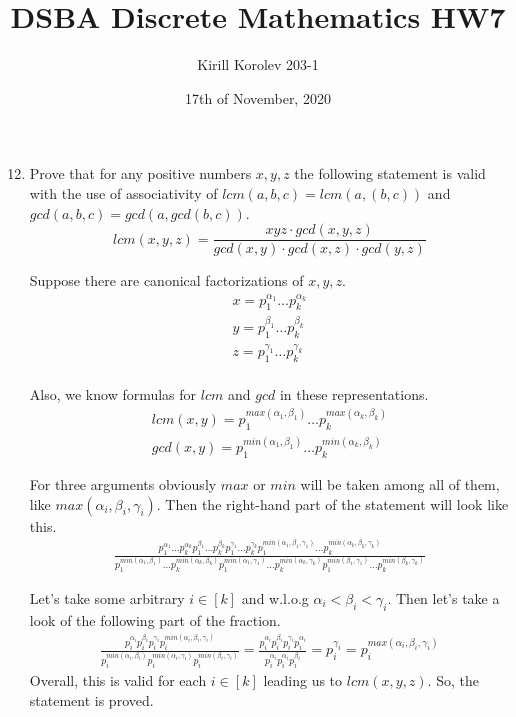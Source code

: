\documentclass{article}
\title{DSBA Discrete Mathematics HW7}
\author{Kirill Korolev 203-1}
\date{17th of November, 2020}
\begin{document}
\maketitle

\begin{enumerate}
\setcounter{enumi}{11}

\item Prove that for any positive numbers $x, y, z$ the following statement is valid with the use of associativity of $lcm(a,b,c)=lcm(a,(b,c))$ and $gcd(a,b,c)=gcd(a,gcd(b,c))$.
\[lcm(x,y,z)=\frac{xyz \cdot gcd(x,y,z)}{gcd(x,y) \cdot gcd(x,z) \cdot gcd(y,z)}\]
\newline

Suppose there are canonical factorizations of $x, y, z$.
\begin{align*}
x=p_1^{\alpha_1}\ldots{}p_k^{\alpha_k}\\
y=p_1^{\beta_1}\ldots{}p_k^{\beta_k}\\
z=p_1^{\gamma_1}\ldots{}p_k^{\gamma_k}\\
\end{align*}

Also, we know formulas for $lcm$ and $gcd$ in these representations.
\begin{align*}
lcm(x,y)=p_1^{max(\alpha_1,\beta_1)}\ldots{}p_k^{max(\alpha_k,\beta_k)}\\
gcd(x,y)=p_1^{min(\alpha_1,\beta_1)}\ldots{}p_k^{min(\alpha_k,\beta_k)}
\end{align*}

For three arguments obviously $max$ or $min$ will be taken among all of them, like $max(\alpha_i,\beta_i,\gamma_i)$. Then the right-hand part of the statement will look like this.
\begin{align*}
\frac{p_1^{\alpha_1}\ldots{}p_k^{\alpha_k}p_1^{\beta_1}\ldots{}p_k^{\beta_k}p_1^{\gamma_1}\ldots{}p_k^{\gamma_k}p_1^{min(\alpha_1,\beta_1,\gamma_1)}\ldots{}p_k^{min(\alpha_k,\beta_k,\gamma_k)}}{p_1^{min(\alpha_1,\beta_1)}\ldots{}p_k^{min(\alpha_k,\beta_k)}p_1^{min(\alpha_1,\gamma_1)}\ldots{}p_k^{min(\alpha_k,\gamma_k)}p_1^{min(\beta_1,\gamma_1)}\ldots{}p_k^{min(\beta_k,\gamma_k)}}
\end{align*}

Let's take some arbitrary $i \in [k]$ and w.l.o.g $\alpha_i < \beta_i < \gamma_i$. Then let's take a look of the following part of the fraction.
\begin{align*}
\frac{p_i^{\alpha_i}p_i^{\beta_i}p_i^{\gamma_i}p_i^{min(\alpha_i,\beta_i,\gamma_i)}}{p_i^{min(\alpha_i,\beta_i)}p_i^{min(\alpha_i,\gamma_i)}p_i^{min(\beta_i,\gamma_i)}}=\frac{p_i^{\alpha_i}p_i^{\beta_i}p_i^{\gamma_i}p_i^{\alpha_i}}{p_i^{\alpha_i}p_i^{\alpha_i}p_i^{\beta_i}}=p_i^{\gamma_i}=p_i^{max(\alpha_i,\beta_i,\gamma_i)}
\end{align*}
Overall, this is valid for each $i \in [k]$ leading us to $lcm(x,y,z)$. So, the statement is proved.


\end{enumerate}
\end{document}
